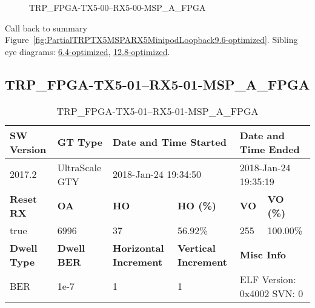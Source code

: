 \begin{figure}[h]
\caption{TRP\_FPGA-TX5-00--RX5-00-MSP\_A\_FPGA} \label{fig:TRPFPGATX500RX500MSPAFPGA9.6-optimized}
\end{figure}

Call back to summary Figure~\ref{fig:PartialTRPTX5MSPARX5MinipodLoopback9.6-optimized}.
Sibling eye diagrams: \hyperref[sec:TRPFPGATX500RX500MSPAFPGA6.4-optimized]{6.4-optimized}, \hyperref[sec:TRPFPGATX500RX500MSPAFPGA12.8-optimized]{12.8-optimized}.

\clearpage
\newpage


\subsection{TRP\_FPGA-TX5-01--RX5-01-MSP\_A\_FPGA}\label{sec:TRPFPGATX501RX501MSPAFPGA9.6-optimized}

\begin{table}[h]
\centering
\caption{TRP\_FPGA-TX5-01--RX5-01-MSP\_A\_FPGA}
\label{tab:TRPFPGATX501RX501MSPAFPGA9.6-optimized}
\begin{tabular}{@{}|l|l|l|l|l|l|@{}}
\toprule
\textbf{SW Version}                & \textbf{GT Type}   & \multicolumn{2}{l|}{\textbf{Date and Time Started}}            & \multicolumn{2}{l|}{\textbf{Date and Time Ended}}        \\ \midrule
2017.2                       & UltraScale GTY          & \multicolumn{2}{l|}{2018-Jan-24 19:34:50}                   & \multicolumn{2}{l|}{2018-Jan-24 19:35:19}               \\ \midrule
\textbf{Reset RX}                  & \textbf{OA} & \textbf{HO}   & \textbf{HO (\%)} & \textbf{VO} & \textbf{VO (\%)} \\ \midrule
true & 6996        & 37          & 56.92\%        & 255        & 100.00\%       \\ \midrule
\textbf{Dwell Type}                & \textbf{Dwell BER} & \textbf{Horizontal Increment} & \textbf{Vertical Increment}    & \multicolumn{2}{l|}{\textbf{Misc Info}}                  \\ \midrule
BER                            & 1e-7        & 1        & 1           & \multicolumn{2}{l|}{ELF Version: 0x4002 SVN: 0}                         \\ \bottomrule
\end{tabular}
\end{table}

